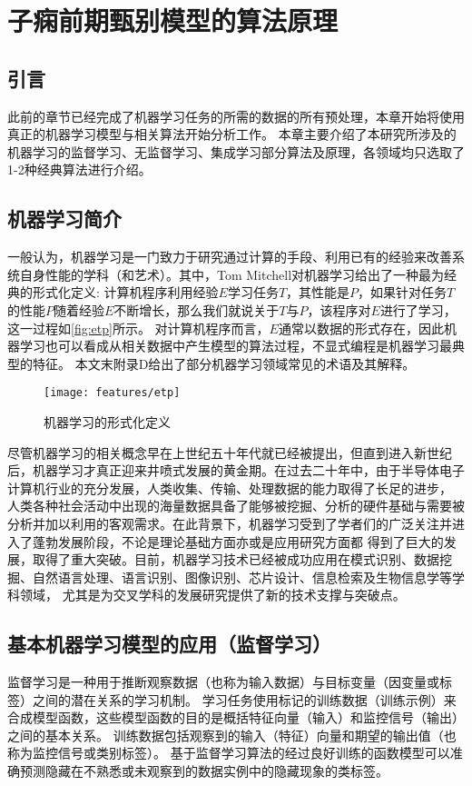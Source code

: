 \chapter{子痫前期甄别模型的算法原理}
\section{引言}
此前的章节已经完成了机器学习任务的所需的数据的所有预处理，本章开始将使用真正的机器学习模型与相关算法开始分析工作。
本章主要介绍了本研究所涉及的机器学习的监督学习、无监督学习、集成学习部分算法及原理，各领域均只选取了1-2种经典算法进行介绍。

\section{机器学习简介}
一般认为，机器学习是一门致力于研究通过计算的手段、利用已有的经验来改善系统自身性能的学科（和艺术）\cite{Zhou2016,Aurélien2018}。其中，Tom Mitchell对机器学习给出了一种最为经典的形式化定义:
计算机程序利用经验$E$学习任务$T$，其性能是$P$，如果针对任务$T$的性能$P$随着经验$E$不断增长，那么我们就说关于$T$与$P$，该程序对$E$进行了学习，这一过程如\autoref{fig:etp}所示\cite{mitchell1997,Zhou2016}。
对计算机程序而言，$E$通常以数据的形式存在，因此机器学习也可以看成从相关数据中产生模型的算法过程，不显式编程是机器学习最典型的特征。
本文末附录D给出了部分机器学习领域常见的术语及其解释。
\begin{figure}[htbp]
  \centering
  \texttt{[image: features/etp]}
  \caption[机器学习方法的形式化定义]{\label{fig:etp}机器学习的形式化定义}
\end{figure}

尽管机器学习的相关概念早在上世纪五十年代就已经被提出，但直到进入新世纪后，机器学习才真正迎来井喷式发展的黄金期。在过去二十年中，由于半导体电子计算机行业的充分发展，人类收集、传输、处理数据的能力取得了长足的进步，
人类各种社会活动中出现的海量数据具备了能够被挖掘、分析的硬件基础与需要被分析并加以利用的客观需求。在此背景下，机器学习受到了学者们的广泛关注并进入了蓬勃发展阶段，不论是理论基础方面亦或是应用研究方面都
得到了巨大的发展，取得了重大突破。目前，机器学习技术已经被成功应用在模式识别、数据挖掘、自然语言处理、语言识别、图像识别、芯片设计、信息检索及生物信息学等学科领域，
尤其是为交叉学科的发展研究提供了新的技术支撑与突破点\cite{Zhou2016,Aurélien2018,Li2017}。

\section{基本机器学习模型的应用（监督学习）}
监督学习是一种用于推断观察数据（也称为输入数据）与目标变量（因变量或标签）之间的潜在关系的学习机制。
学习任务使用标记的训练数据（训练示例）来合成模型函数，这些模型函数的目的是概括特征向量（输入）和监控信号（输出）之间的基本关系。
训练数据包括观察到的输入（特征）向量和期望的输出值（也称为监控信号或类别标签）。
基于监督学习算法的经过良好训练的函数模型可以准确预测隐藏在不熟悉或未观察到的数据实例中的隐藏现象的类标签。

